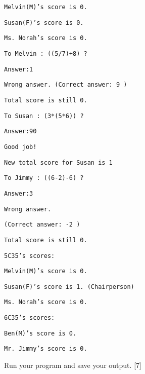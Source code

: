 \noindent %
\noindent\begin{minipage}[t]{1\columnwidth}%
\texttt{Melvin(M)'s score is 0. }

\texttt{Susan(F)'s score is 0. }

\texttt{Ms. Norah's score is 0. \bigskip{}
}

\texttt{To Melvin : ((5/7)+8) ? }

\texttt{Answer:1 }

\texttt{Wrong answer. (Correct answer: 9 ) }

\texttt{Total score is still 0. \bigskip{}
}

\texttt{To Susan : (3{*}(5{*}6)) ? }

\texttt{Answer:90 }

\texttt{Good job! }

\texttt{New total score for Susan is 1 \bigskip{}
}

\texttt{To Jimmy : ((6-2)-6) ? }

\texttt{Answer:3 }

\texttt{Wrong answer. }

\texttt{(Correct answer: -2 ) }

\texttt{Total score is still 0. \bigskip{}
}

\texttt{5C35\textquoteright s scores:}

\texttt{Melvin(M)'s score is 0. }

\texttt{Susan(F)'s score is 1. (Chairperson) }

\texttt{Ms. Norah's score is 0.\bigskip{}
}

\texttt{6C35\textquoteright s scores:}

\texttt{Ben(M)'s score is 0. }

\texttt{Mr. Jimmy's score is 0. }%
\end{minipage}

Run your program and save your output. \hfill{}{[}7{]}